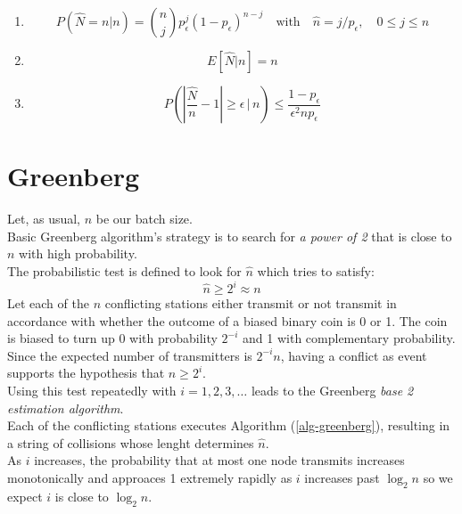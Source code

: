 \documentclass[12pt,a4paper]{report}
\newcommand{\pc}{p_{\epsilon}}
\begin{document}
\begin{enumerate}[1)]
\item \begin{equation}P\left(\hat{N}=n|n\right)={n \choose j}\pc^{j}(1-\pc)^{n-j} \quad \textrm{with} \quad \hat{n}=j/\pc, \quad 0\leq j\leq n\end{equation}
\item \begin{equation}E[\hat{N}|n]=n\end{equation}
\item  \begin{equation}
P\left( \left| \frac{\hat{N}}{n}-1\right| \geq \epsilon  \,\big|\, n \right) \leq \frac{1-\pc}{\epsilon^{2}n\pc}
 \end{equation}
\end{enumerate}
\clearpage
\section{Greenberg}

Let, as usual, $n$ be our batch size.\\
Basic Greenberg algorithm's strategy is to search for \emph{a power of 2} that is close to $n$ with high probability.\\
The probabilistic test is defined to look for $\hat{n}$ which tries to satisfy:\\
\begin{equation}
\hat{n}\geq 2^{i} \approx n
\end{equation}
Let each of the $n$ conflicting stations either transmit or not transmit in accordance with whether the outcome of a biased binary coin is 0 or 1. The coin is biased to turn up 0 with probability  $2^{-i}$ and 1 with complementary probability. Since the expected number of transmitters is $2^{-i}n$, having a conflict as event supports the hypothesis that $n\geq2^{i}$.\\
Using this test repeatedly with $i=1, 2, 3, \ldots$ leads to the Greenberg \emph{base 2 estimation algorithm}.\\
Each of the conflicting stations executes Algorithm (\ref{alg-greenberg}), resulting in a string of collisions whose lenght determines $\hat{n}$.\\

As $i$ increases, the probability that at most one node transmits increases monotonically and approaces 1 extremely rapidly as $i$ increases past $\log_{2}n$ so we expect $i$ is close to $\log_{2}n$.\\
\end{document}
